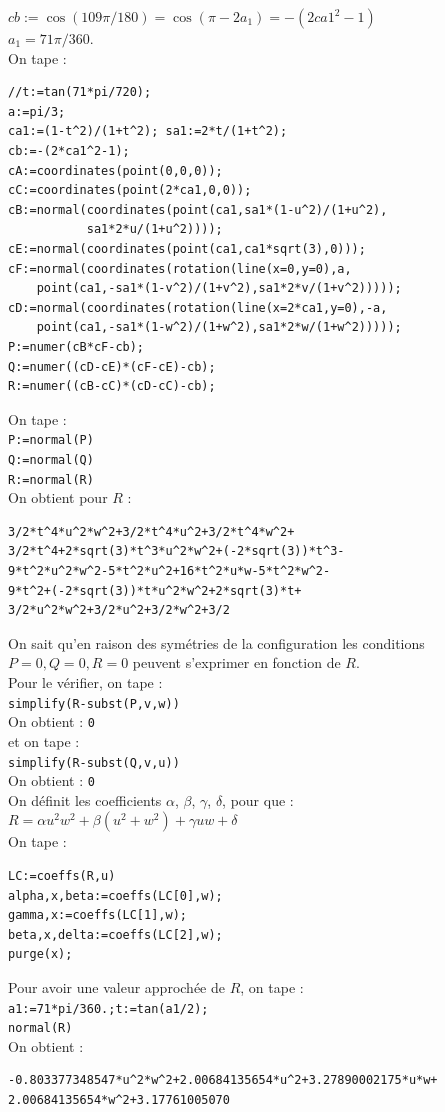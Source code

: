 \documentclass[a4paper,11pt]{book}
\begin{document}
$cb:=\cos(109\pi/180)=\cos(\pi-2a_1)=-(2ca1^2-1)$\\ 
$a_1=71\pi/360$.\\
On tape :
\begin{verbatim}
//t:=tan(71*pi/720);
a:=pi/3;
ca1:=(1-t^2)/(1+t^2); sa1:=2*t/(1+t^2);
cb:=-(2*ca1^2-1);
cA:=coordinates(point(0,0,0));
cC:=coordinates(point(2*ca1,0,0));
cB:=normal(coordinates(point(ca1,sa1*(1-u^2)/(1+u^2),
           sa1*2*u/(1+u^2))));
cE:=normal(coordinates(point(ca1,ca1*sqrt(3),0)));
cF:=normal(coordinates(rotation(line(x=0,y=0),a,
    point(ca1,-sa1*(1-v^2)/(1+v^2),sa1*2*v/(1+v^2)))));
cD:=normal(coordinates(rotation(line(x=2*ca1,y=0),-a,
    point(ca1,-sa1*(1-w^2)/(1+w^2),sa1*2*w/(1+w^2)))));
P:=numer(cB*cF-cb);
Q:=numer((cD-cE)*(cF-cE)-cb);
R:=numer((cB-cC)*(cD-cC)-cb);
\end{verbatim}
On tape :\\
{\tt P:=normal(P)}\\
{\tt Q:=normal(Q)}\\
{\tt R:=normal(R)}\\
On obtient pour $R$ :
\begin{verbatim}
3/2*t^4*u^2*w^2+3/2*t^4*u^2+3/2*t^4*w^2+
3/2*t^4+2*sqrt(3)*t^3*u^2*w^2+(-2*sqrt(3))*t^3-
9*t^2*u^2*w^2-5*t^2*u^2+16*t^2*u*w-5*t^2*w^2-
9*t^2+(-2*sqrt(3))*t*u^2*w^2+2*sqrt(3)*t+
3/2*u^2*w^2+3/2*u^2+3/2*w^2+3/2
\end{verbatim}
On sait qu'en raison des sym\'etries de la configuration les conditions 
$P=0,Q=0,R=0$ peuvent s'exprimer en fonction de $R$.\\
Pour le v\'erifier, on tape :\\
{\tt simplify(R-subst(P,v,w))}\\
On obtient : {\tt 0}\\
et on tape :\\
{\tt simplify(R-subst(Q,v,u))}\\
On obtient : {\tt 0}\\
On d\'efinit les coefficients $\alpha$, $\beta$, $\gamma$, $\delta$, pour 
que :\\
$R=\alpha u^2w^2+\beta(u^2+w^2)+\gamma uw+\delta$\\
On tape :
\begin{verbatim}
LC:=coeffs(R,u)
alpha,x,beta:=coeffs(LC[0],w);
gamma,x:=coeffs(LC[1],w);
beta,x,delta:=coeffs(LC[2],w);
purge(x);
\end{verbatim}
Pour avoir une valeur approch\'ee de $R$, on tape :\\
{\tt a1:=71*pi/360.;t:=tan(a1/2);}\\
{\tt normal(R)}\\
On obtient : 
\begin{verbatim}
-0.803377348547*u^2*w^2+2.00684135654*u^2+3.27890002175*u*w+
2.00684135654*w^2+3.17761005070
\end{verbatim}
\end{document}
